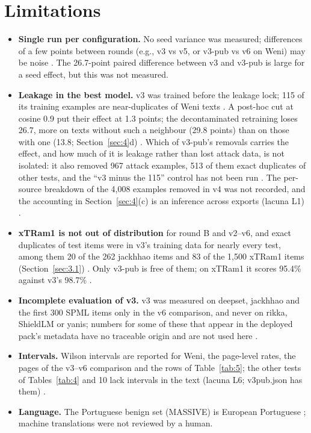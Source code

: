 \documentclass[11pt]{article}
\begin{document}
\section{Limitations}\label{sec:10}

\begin{itemize}
\item \textbf{Single run per configuration.} No seed variance was measured; differences of a few points between rounds (e.g., v3 vs v5, or v3-pub vs v6 on Weni) may be noise%
. The 26.7-point paired difference between v3 and v3-pub is large for a seed effect, but this was not measured.
\item \textbf{Leakage in the best model.} v3 was trained before the leakage lock; 115 of its training examples are near-duplicates of Weni texts%
. A post-hoc cut at cosine 0.9 put their effect at 1.3 points; the decontaminated retraining loses 26.7, more on texts without such a neighbour (29.8 points) than on those with one (13.8; Section~\ref{sec:4}d)%
. Which of v3-pub's removals carries the effect, and how much of it is leakage rather than lost attack data, is not isolated: it also removed 967 attack examples, 513 of them exact duplicates of other tests, and the ``v3 minus the 115'' control has not been run%
. The per-source breakdown of the 4,008 examples removed in v4 was not recorded, and the accounting in Section~\ref{sec:4}(c) is an inference across exports (lacuna L1)%
.
\item \textbf{xTRam1 is not out of distribution} for round B and v2–v6, and exact duplicates of test items were in v3's training data for nearly every test, among them 20 of the 262 jackhhao items and 83 of the 1,500 xTRam1 items (Section~\ref{sec:3.1})%
. Only v3-pub is free of them; on xTRam1 it scores 95.4\% against v3's 98.7\%%
.
\item \textbf{Incomplete evaluation of v3.} v3 was measured on deepset, jackhhao and the first 300 SPML items only in the v6 comparison, and never on rikka, ShieldLM or yanis; numbers for some of these that appear in the deployed pack's metadata have no traceable origin and are not used here%
.
\item \textbf{Intervals.} Wilson intervals are reported for Weni, the page-level rates, the pages of the v3–v6 comparison and the rows of Table~\ref{tab:5}; the other tests of Tables~\ref{tab:4} and 10 lack intervals in the text (lacuna L6; v3pub.json has them)%
.
\item \textbf{Language.} The Portuguese benign set (MASSIVE) is European Portuguese%
; machine translations were not reviewed by a human.

\end{itemize}
\end{document}
